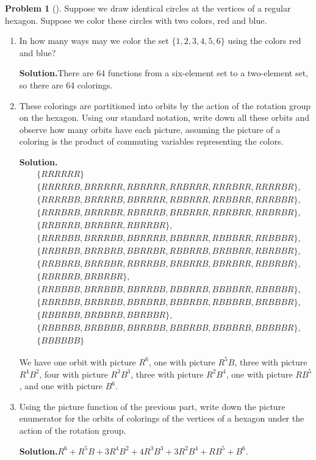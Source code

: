 \documentclass[10pt,]{book}
\theoremstyle{plain}
\theoremstyle{definition}
\newtheorem{activity}[project]{Problem}
\theoremstyle{definition}
\numberwithin{equation}{chapter}
\begin{document}
\begin{activity}[]\label{coloredhex}
Suppose we draw identical circles at the vertices of a regular hexagon. Suppose we color these circles with two colors, red and blue.%
\begin{enumerate}[font=\bfseries,label=(\alph*),ref=\alph*]
\item\label{task-226} In how many ways may we color the set \(\{1, 2, 3, 4, 5, 6\}\) using the colors red and blue?%
\par\medskip\noindent%
\textbf{Solution.}\quad There are 64 functions from a six-element set to a two-element set, so there are 64 colorings.%
\item\label{task-227} These colorings are partitioned into orbits by the action of the rotation group on the hexagon. Using our standard notation, write down all these orbits and observe how many orbits have each picture, assuming the picture of a coloring is the product of commuting variables representing the colors.%
\par\medskip\noindent%
\textbf{Solution.}\quad %
\begin{align*}
&\{RRRRRR\}\\
&\{RRRRRB, BRRRRR, RBRRRR, RRBRRR, RRRBRR, RRRRBR\},\\
&\{RRRRBB, BRRRRB, BBRRRR, RBBRRR, RRBBRR, RRRBBR\},\\
&\{RRRBRB, BRRRBR, RBRRRB, BRBRRR, RBRBRR, RRBRBR\},\\
&\{RRBRRB, BRRBRR, RBRRBR\},\\
&\{RRRBBB, BRRRBB, BBRRRB, BBBRRR, RBBBRR, RRBBBR\},\\
&\{RRBRBB, BRRBRB, BBRRBR, RBBRRB, BRBBRR, RBRBBR\},\\
&\{RRBBRB, BRRBBR, RBRRBB, BRBRRB, BBRBRR, RBBRBR\},\\
&\{RBRBRB, BRBRBR\},\\
&\{RRBBBB, BRRBBB, BBRRBB, BBBRRB, BBBBRR, RBBBBR\},\\
&\{RBRBBB, BRBRBB, BBRBRB, BBBRBR, RBBBRB, BRBBBR\},\\
&\{RBBRBB, BRBBRB, BBRBBR\},\\
&\{RBBBBB, BRBBBB, BBRBBB, BBBRBB, BBBBRB, BBBBBR\},\\
&\{BBBBBB\}
\end{align*}
%
\par
We have one orbit with picture \(R^6\), one with picture \(R^5B\), three with picture \(R^4B^2\), four with picture \(R^3B^3\), three with picture \(R^2B^4\), one with picture \(RB^5\), and one with picture \(B^6\).%
\item\label{picture-enumerator-hexagon} Using the picture function of the previous part, write down the picture enumerator for the orbits of colorings of the vertices of a hexagon under the action of the rotation group.%
\par\medskip\noindent%
\textbf{Solution.}\quad \(R^6 + R^5B + 3R^4B^2 + 4R^3B^3 + 3R^2B^4 + RB^5 + B^6\).%
\end{enumerate}
\end{activity}
\end{document}

